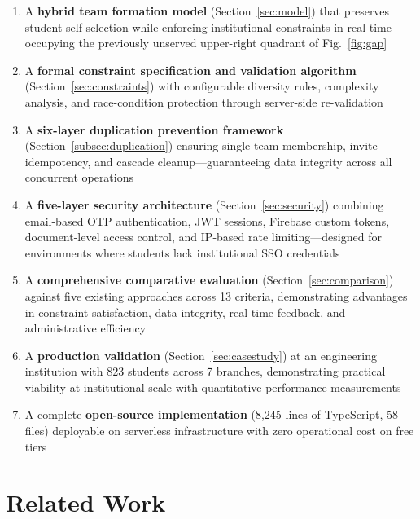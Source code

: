 \documentclass[conference]{IEEEtran}
\begin{document}
\begin{enumerate}[noitemsep,topsep=3pt]
    \item A \textbf{hybrid team formation model} (Section~\ref{sec:model}) that preserves student self-selection while enforcing institutional constraints in real time---occupying the previously unserved upper-right quadrant of Fig.~\ref{fig:gap}

    \item A \textbf{formal constraint specification and validation algorithm} (Section~\ref{sec:constraints}) with configurable diversity rules, complexity analysis, and race-condition protection through server-side re-validation

    \item A \textbf{six-layer duplication prevention framework} (Section~\ref{subsec:duplication}) ensuring single-team membership, invite idempotency, and cascade cleanup---guaranteeing data integrity across all concurrent operations

    \item A \textbf{five-layer security architecture} (Section~\ref{sec:security}) combining email-based OTP authentication, JWT sessions, Firebase custom tokens, document-level access control, and IP-based rate limiting---designed for environments where students lack institutional SSO credentials

    \item A \textbf{comprehensive comparative evaluation} (Section~\ref{sec:comparison}) against five existing approaches across 13 criteria, demonstrating advantages in constraint satisfaction, data integrity, real-time feedback, and administrative efficiency

    \item A \textbf{production validation} (Section~\ref{sec:casestudy}) at an engineering institution with 823 students across 7 branches, demonstrating practical viability at institutional scale with quantitative performance measurements

    \item A complete \textbf{open-source implementation} (8,245 lines of TypeScript, 58 files) deployable on serverless infrastructure with zero operational cost on free tiers
\end{enumerate}

\section{Related Work}
\label{sec:related}
\end{document}
